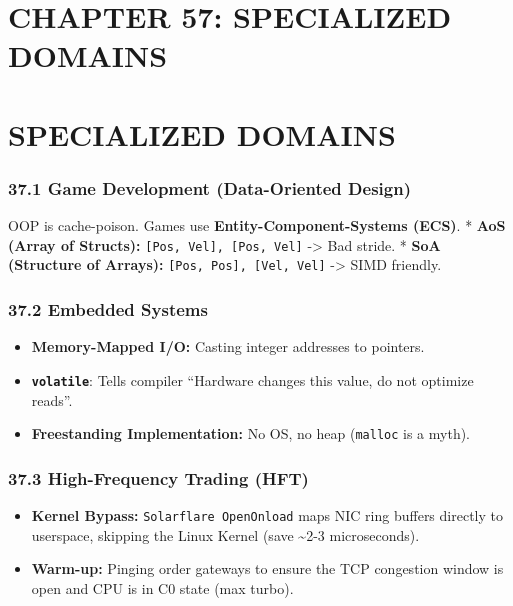 \hypertarget{chapter-57-specialized-domains}{%
\section{CHAPTER 57: SPECIALIZED
DOMAINS}\label{chapter-57-specialized-domains}}

\hypertarget{specialized-domains}{%
\section{SPECIALIZED DOMAINS}\label{specialized-domains}}

\hypertarget{game-development-data-oriented-design}{%
\subsubsection{37.1 Game Development (Data-Oriented
Design)}\label{game-development-data-oriented-design}}

OOP is cache-poison. Games use \textbf{Entity-Component-Systems (ECS)}.
* \textbf{AoS (Array of Structs):}
\passthrough{\lstinline![Pos, Vel], [Pos, Vel]!} -\textgreater{} Bad
stride. * \textbf{SoA (Structure of Arrays):}
\passthrough{\lstinline![Pos, Pos], [Vel, Vel]!} -\textgreater{} SIMD
friendly.

\hypertarget{embedded-systems}{%
\subsubsection{37.2 Embedded Systems}\label{embedded-systems}}

\begin{itemize}
\tightlist
\item
  \textbf{Memory-Mapped I/O:} Casting integer addresses to pointers.
\item
  \textbf{\passthrough{\lstinline!volatile!}}: Tells compiler ``Hardware
  changes this value, do not optimize reads''.
\item
  \textbf{Freestanding Implementation:} No OS, no heap
  (\passthrough{\lstinline!malloc!} is a myth).
\end{itemize}

\hypertarget{high-frequency-trading-hft}{%
\subsubsection{37.3 High-Frequency Trading
(HFT)}\label{high-frequency-trading-hft}}

\begin{itemize}
\tightlist
\item
  \textbf{Kernel Bypass:}
  \passthrough{\lstinline!Solarflare OpenOnload!} maps NIC ring buffers
  directly to userspace, skipping the Linux Kernel (save
  \textasciitilde2-3 microseconds).
\item
  \textbf{Warm-up:} Pinging order gateways to ensure the TCP congestion
  window is open and CPU is in C0 state (max turbo).
\end{itemize}

